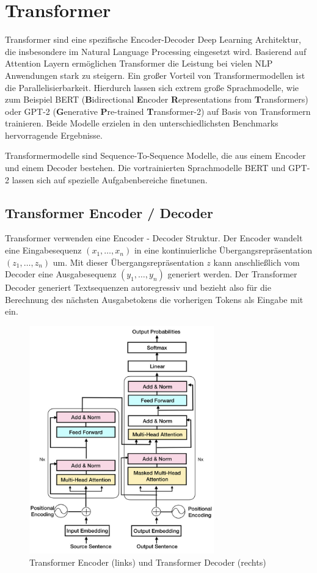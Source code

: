 \section{Transformer}\raggedbottom \label{transformer}
Transformer sind eine spezifische Encoder-Decoder Deep Learning Architektur, die insbesondere im Natural Language Processing eingesetzt wird. 
Basierend auf Attention Layern ermöglichen Transformer die Leistung bei vielen NLP Anwendungen stark zu steigern. 
Ein großer Vorteil von Transformermodellen ist die Parallelisierbarkeit. 
Hierdurch lassen sich extrem große Sprachmodelle, wie zum Beispiel BERT (\textbf{B}idirectional \textbf{E}ncoder \textbf{R}epresentations from \textbf{T}ransformers) oder GPT-2 (\textbf{G}enerative \textbf{P}re-trained \textbf{T}ransformer-2) auf Basis von Transformern trainieren. 
Beide Modelle erzielen in den unterschiedlichsten Benchmarks hervorragende Ergebnisse.

Transformermodelle sind Sequence-To-Sequence Modelle, die aus einem Encoder und einem Decoder bestehen.
Die vortrainierten Sprachmodelle BERT und GPT-2 lassen sich auf spezielle Aufgabenbereiche finetunen.


\subsection{Transformer Encoder / Decoder}
Transformer verwenden eine Encoder - Decoder Struktur. Der Encoder wandelt eine Eingabesequenz $(x_1,\ldots,x_n)$ in eine kontinuierliche Übergangsrepräsentation $(z_1, \ldots, z_n)$ um. 
Mit dieser Übergangsrepräsentation $z$ kann anschließlich vom Decoder eine Ausgabesequenz $(y_1, \ldots, y_n)$ generiert werden.
Der Transformer Decoder generiert Textsequenzen autoregressiv und bezieht also für die Berechnung des nächsten Ausgabetokens die vorherigen Tokens als Eingabe mit ein.


\begin{figure}[h]
    \label{transformerfig}
    \centering
    \includegraphics[width=8cm]{bilder/Transformer-Encoder-Decoder}
    \caption{Transformer Encoder (links) und Transformer Decoder (rechts)}
\end{figure}


